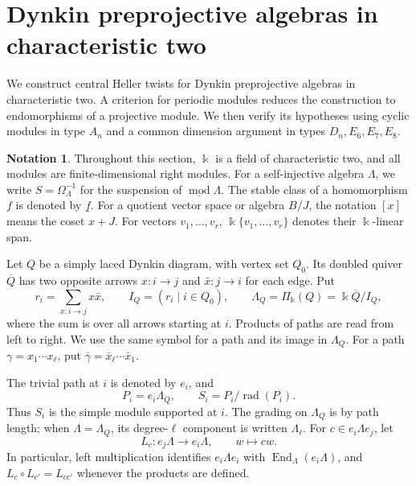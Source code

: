 \documentclass[a4paper,11pt,reqno]{amsart}
\theoremstyle{definition}
\newtheorem{notation}[notation]{Notation}
\theoremstyle{plain}
\numberwithin{equation}{section}
\newcommand{\End}{\operatorname{End}}
\newcommand{\kk}{\Bbbk}
\begin{document}
\section{Dynkin preprojective algebras in characteristic two}
\label{sec:ade-lines}

We construct central Heller twists for Dynkin preprojective algebras
in characteristic two.  A criterion for periodic modules reduces the
construction to endomorphisms of a projective module.  We then verify
its hypotheses using cyclic modules in type \(A_n\) and a common
dimension argument in types \(D_n,E_6,E_7,E_8\).

\begin{notation}
\label{not:ade-modules}
Throughout this section, \(\kk\) is a field of characteristic two,
and all modules are finite-dimensional right modules.  For a
self-injective algebra \(\Lambda\), we write
\(S=\Omega_\Lambda^{-1}\) for the suspension of
\(\underline{\operatorname{mod}}\Lambda\).  The stable class of a
homomorphism \(f\) is denoted by \(\underline f\).
For a quotient vector space or algebra \(B/J\), the notation
\([x]\) means the coset \(x+J\).  For vectors \(v_1,\ldots,v_r\),
\(\kk\{v_1,\ldots,v_r\}\) denotes their \(\kk\)-linear span.

Let \(Q\) be a simply laced Dynkin diagram, with vertex set \(Q_0\).
Its doubled quiver \(\overline Q\) has two opposite arrows
\(x:i\to j\) and \(\bar x:j\to i\) for each edge.  Put
\[
 r_i=\sum_{x:i\to j}x\bar x,\qquad
 I_Q=(r_i\mid i\in Q_0),\qquad
 \Lambda_Q=\Pi_\kk(Q)=\kk\overline Q/I_Q,
\]
where the sum is over all arrows starting at \(i\).
Products of paths are read from left to right.  We use the same
symbol for a path and its image in \(\Lambda_Q\).  For a path
\(\gamma=x_1\cdots x_\ell\), put
\(\bar\gamma=\bar x_\ell\cdots\bar x_1\).

The trivial path at \(i\) is denoted by \(e_i\), and
\[
 P_i=e_i\Lambda_Q,\qquad S_i=P_i/\operatorname{rad}(P_i).
\]
Thus \(S_i\) is the simple module supported at \(i\).
The grading on \(\Lambda_Q\) is by path length; when
\(\Lambda=\Lambda_Q\), its degree-\(\ell\) component is written
\(\Lambda_\ell\).  For \(c\in e_i\Lambda e_j\), let
\[
 L_c:e_j\Lambda\longrightarrow e_i\Lambda,\qquad w\longmapsto cw.
\]
In particular, left multiplication identifies \(e_i\Lambda e_i\)
with \(\End_\Lambda(e_i\Lambda)\), and
\(L_c\circ L_{c'}=L_{cc'}\) whenever the products are defined.
\end{notation}
\end{document}
